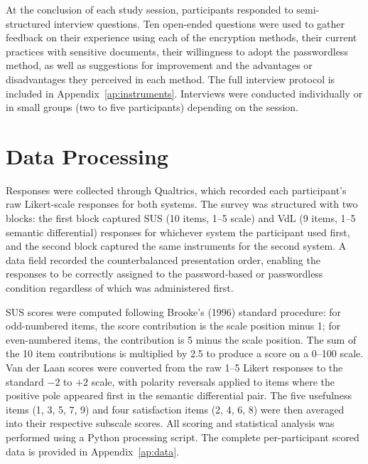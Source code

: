 At the conclusion of each study session, participants responded to semi-structured interview questions. Ten open-ended questions were used to gather feedback on their experience using each of the encryption methods, their current practices with sensitive documents, their willingness to adopt the passwordless method, as well as suggestions for improvement and the advantages or disadvantages they perceived in each method. The full interview protocol is included in Appendix~\ref{ap:instruments}. Interviews were conducted individually or in small groups (two to five participants) depending on the session.

\section{Data Processing}
\label{sec:data-processing}

Responses were collected through Qualtrics, which recorded each participant's raw Likert-scale responses for both systems. The survey was structured with two blocks: the first block captured SUS (10 items, 1--5 scale) and VdL (9 items, 1--5 semantic differential) responses for whichever system the participant used first, and the second block captured the same instruments for the second system. A data field recorded the counterbalanced presentation order, enabling the responses to be correctly assigned to the password-based or passwordless condition regardless of which was administered first.

SUS scores were computed following Brooke's (1996) standard procedure: for odd-numbered items, the score contribution is the scale position minus 1; for even-numbered items, the contribution is 5 minus the scale position. The sum of the 10 item contributions is multiplied by 2.5 to produce a score on a 0--100 scale. Van der Laan scores were converted from the raw 1--5 Likert responses to the standard $-2$ to $+2$ scale, with polarity reversals applied to items where the positive pole appeared first in the semantic differential pair. The five usefulness items (1, 3, 5, 7, 9) and four satisfaction items (2, 4, 6, 8) were then averaged into their respective subscale scores. All scoring and statistical analysis was performed using a Python processing script. The complete per-participant scored data is provided in Appendix~\ref{ap:data}.
